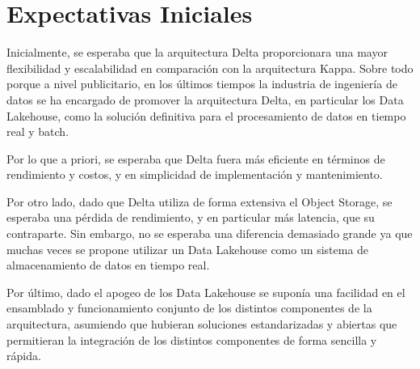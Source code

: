 \section{Expectativas Iniciales}

Inicialmente, se esperaba que la arquitectura Delta proporcionara una mayor flexibilidad y escalabilidad en comparación con la arquitectura Kappa.
Sobre todo porque a nivel publicitario, en los últimos tiempos la industria de ingeniería de datos se ha encargado de promover la arquitectura Delta, 
en particular los Data Lakehouse, como la solución definitiva para el procesamiento de datos en tiempo real y batch.\newline

Por lo que a priori, se esperaba que Delta fuera más eficiente en términos de rendimiento y costos, y en simplicidad de implementación y mantenimiento.\newline

Por otro lado, dado que Delta utiliza de forma extensiva el Object Storage, se esperaba una pérdida de rendimiento, y en particular más latencia, que su contraparte. 
Sin embargo, no se esperaba una diferencia demasiado grande ya que muchas veces se propone utilizar un Data Lakehouse como un sistema de almacenamiento de datos en tiempo real.\newline

Por último, dado el apogeo de los Data Lakehouse se suponía una facilidad en el ensamblado y funcionamiento conjunto de los distintos componentes de la arquitectura,
asumiendo que hubieran soluciones estandarizadas y abiertas que permitieran la integración de los distintos componentes de forma sencilla y rápida. 

\newpage
